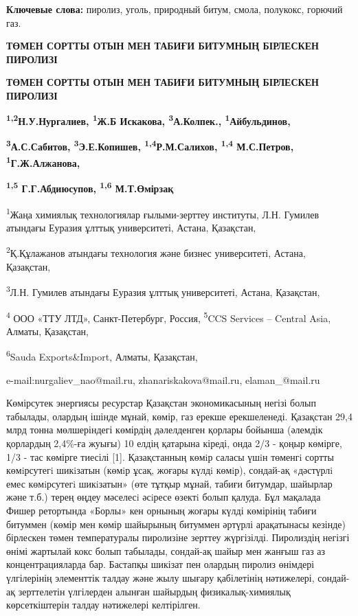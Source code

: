 {\bfseries Ключевые слова:} пиролиз, уголь, природный битум, смола,
полукокс, горючий газ.

{\bfseries ТӨМЕН СОРТТЫ ОТЫН МЕН ТАБИҒИ БИТУМНЫҢ БІРЛЕСКЕН ПИРОЛИЗІ}

{\bfseries ТӨМЕН СОРТТЫ ОТЫН МЕН ТАБИҒИ БИТУМНЫҢ БІРЛЕСКЕН ПИРОЛИЗІ}

{\bfseries \textsuperscript{1,2}Н.У.Нургалиев, \textsuperscript{1}Ж.Б
Искакова, \textsuperscript{3}А.Колпек., \textsuperscript{1}Айбульдинов,}

{\bfseries \textsuperscript{3}А.С.Сабитов, \textsuperscript{3}Э.Е.Копишев,
\textsuperscript{1,4}Р.М.Салихов, \textsuperscript{1,4} М.С.Петров,
\textsuperscript{1}Г.Ж.Алжанова,}

{\bfseries \textsuperscript{1,5} Г.Г.Абдиюсупов, \textsuperscript{1,6}
М.Т.Өмірзақ}

\textsuperscript{1}Жаңа химиялық технологиялар ғылыми-зерттеу институты,
Л.Н. Гумилев атындағы Еуразия ұлттық университеті, Астана, Қазақстан,

\textsuperscript{2}Қ.Құлажанов атындағы технология және бизнес
университеті, Астана, Қазақстан,

\textsuperscript{3}Л.Н. Гумилев атындағы Еуразия ұлттық университеті,
Астана, Қазақстан,

\textsuperscript{4} ООО «ТТУ ЛТД», Санкт-Петербург, Россия,
\textsuperscript{5}CCS Services -- Central Asia, Алматы, Қазақстан,

\textsuperscript{6}Sauda Exports\&Import, Алматы, Қазақстан,

e-mail:nurgaliev\_nao@mail.ru, zhanariskakova@mail.ru, elaman\_@mail.ru

Көмірсутек энергиясы ресурстар Қазақстан экономикасының негізі болып
табылады, олардың ішінде мұнай, көмір, газ ерекше ерекшеленеді.
Қазақстан 29,4 млрд тонна мөлшеріндегі көмірдің дәлелденген қорлары
бойынша (әлемдік қорлардың 2,4\%-ға жуығы) 10 елдің қатарына кіреді,
онда 2/3 - қоңыр көмірге, 1/3 - тас көмірге тиесілі {[}1{]}.
Қазақстанның көмiр саласы үшiн төменгi сортты көмiрсутегi шикiзатын
(көмiр ұсақ, жоғары күлдi көмiр), сондай-ақ «дәстүрлi емес көмiрсутегi
шикiзатын» (өте тұтқыр мұнай, табиғи битумдар, шайырлар және т.б.) терең
өңдеу мәселесi әсiресе өзектi болып қалуда. Бұл мақалада Фишер
ретортында «Борлы» кен орнының жоғары күлді көмірінің табиғи битуммен
(көмір мен көмір шайырының битуммен әртүрлі арақатынасы кезінде)
бірлескен төмен температуралы пиролизіне зерттеу жүргізілді. Пиролиздің
негізгі өнімі жартылай кокс болып табылады, сондай-ақ шайыр мен жанғыш
газ аз концентрацияларда бар. Бастапқы шикізат пен олардың пиролиз
өнімдері үлгілерінің элементтік талдау және жылу шығару қабілетінің
нәтижелері, сондай-ақ зерттелетін үлгілерден алынған шайырдың
физикалық-химиялық көрсеткіштерін талдау нәтижелері келтірілген.

